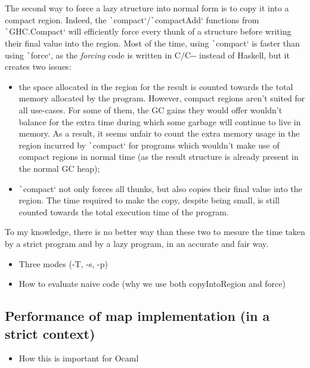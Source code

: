 \documentclass[english]{jflart}
\begin{document}
The second way to force a lazy structure into normal form is to copy it into a compact region. Indeed, the \texttt`compact`/\texttt`compactAdd` functions from \texttt`GHC.Compact` will efficiently force every thunk of a structure before writing their final value into the region. Most of the time, using \texttt`compact` is faster than using \texttt`force`, as the  \emph{forcing} code is written in C/C-{}- instead of Haskell, but it creates two issues:

\begin{itemize}
  \item the space allocated in the region for the result is counted towards the total memory allocated by the program. However, compact regions aren't suited for all use-cases. For some of them, the GC gains they would offer wouldn't balance for the extra time during which some garbage will continue to live in memory. As a result, it seems unfair to count the extra memory usage in the region incurred by \texttt`compact` for programs which wouldn't make use of compact regions in normal time (as the result structure is already present in the normal GC heap);
  \item \texttt`compact` not only forces all thunks, but also copies their final value into the region. The time required to make the copy, despite being small, is still counted towards the total execution time of the program.
\end{itemize}

To my knowledge, there is no better way than these two to mesure the time taken by a strict program and by a lazy program, in an accurate and fair way.


\begin{itemize}
\item Three modes (-T, -s, -p)
\item How to evaluate naive code (why we use both copyIntoRegion and force)
\end{itemize}

\subsection{Performance of map implementation (in a strict context)}

\begin{itemize}
\item How this is important for Ocaml
\end{itemize}
\end{document}
